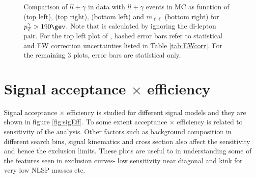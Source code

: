 \begin{figure}[h!]
\caption[$ll+\gamma$ in data vs $ll+\gamma$ in MC]{Comparison of $ll+\gamma$ in data with $ll+\gamma$ events in MC as function of \ptmiss (top left), \nj (top right), \nb (bottom left) and $m_{\ell\ell}$ (bottom right) for $p_T^{\gamma}>190\gev$. Note that \ptmiss is calculated by ignoring the di-lepton pair. For the top left plot of \ptmiss, hashed error bars refer to statistical and EW correction uncertainties listed in Table \ref{tab:EWcorr}. For the remaining 3 plots, error bars are statistical only.}
\label{fig:llGammaDataMC}
\end{figure}

\section{Signal acceptance $\times$ efficiency}
\label{sec:SigAccEff}
Signal acceptance $\times$ efficiency is studied for different signal models and they are shown in figure \ref{fig:sigEff}. To some extent acceptance $\times$ efficiency is related to sensitivity of the analysis. Other factors such as background composition in different search bins, signal kinematics and cross section also affect the sensitivity and hence the exclusion limits. These plots are useful to in understanding some of the features seen in exclusion curves- low sensitivity near diagonal and kink for very low NLSP masses etc.
